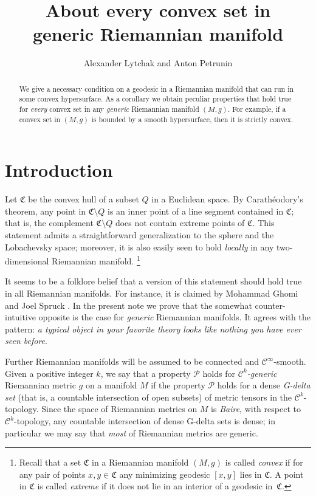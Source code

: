 \documentclass[a4paper,10pt]{article}
\def\thetitle{About every convex set in\\ generic Riemannian manifold}
\begin{document}
\title{\thetitle}
\author{Alexander Lytchak and Anton Petrunin}
\date{}
\maketitle

\begin{abstract}
We give a necessary condition on a geodesic in a Riemannian manifold that can run in some convex hypersurface.
As a corollary we obtain peculiar properties that hold true for \emph{every} convex set in any \emph{generic} Riemannian manifold $(M,g)$.
For example, if a convex set in $(M,g)$ is bounded by a smooth hypersurface, then it is strictly convex.
\end{abstract}

\section{Introduction}
Let $\mathfrak{C}$ be the convex hull of a subset $Q$ in a Euclidean space.
By Carathéodory's theorem, any point in $\mathfrak{C}\setminus Q$ is an inner point of a line segment contained in $\mathfrak{C}$;
that is, the complement $\mathfrak{C} \setminus Q$ does not contain extreme points of $\mathfrak{C}$.
This statement admits a straightforward generalization to the sphere and the  Lobachevsky space; moreover, it  is also easily seen to hold \emph{locally} in any two-dimensional Riemannian manifold.%
\footnote{Recall that a set $\mathfrak{C}$ in a Riemannian manifold $(M,g)$ is called \emph{convex} if for any pair of points $x,y\in \mathfrak{C}$ any minimizing geodesic $[x,y]$ lies in $\mathfrak{C}$.
A point in $\mathfrak{C}$ is called \emph{extreme} if it does not lie in an interior of a geodesic in~$\mathfrak{C}$.}

It seems to be a folklore belief that a version of this statement should hold true in all Riemannian manifolds.
For instance, it is claimed by Mohammad Ghomi and Joel Spruck \cite[Lemma 9.1]{Ghomi}.
In the present note we prove that the somewhat counter-intuitive opposite is the case for \emph{generic} Riemannian manifolds.
It agrees with the pattern: \emph{a typical object in your favorite theory looks like nothing you have ever seen before}.

Further Riemannian manifolds will be assumed to be connected and $\mathcal C^\infty$-smooth.
Given a positive integer $k$, we say that a property $\mathcal P$ holds for \emph{$\mathcal C^k$-generic} Riemannian metric $g$ on a manifold $M$ 
if the property $\mathcal P$ holds for a dense \emph{G-delta set} (that is, a countable intersection of open subsets) of metric tensors in the $\mathcal C^k$-topology.
Since the space of Riemannian metrics  on $M$ is \emph{Baire}, with  respect to $\mathcal C^k$-topology, any 
countable intersection of dense G-delta sets is dense;
in particular we may say that \emph{most} of Riemannian metrics are generic.
\end{document}

